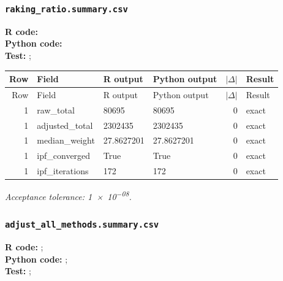 \documentclass[10pt]{article}
\begin{document}
\subsubsection{\texorpdfstring{\texttt{raking\_ratio.summary.csv}}{raking\_ratio.summary.csv}}
{\footnotesize \textbf{R code:} \\ \textbf{Python code:} \\ \textbf{Test:} ; \par}

\small
\begin{longtable}{@{}r p{}p{}p{}rl@{}}
\toprule
Row & Field & R output & Python output & $|\Delta|$ & Result \\
\midrule
\endfirsthead
\toprule
Row & Field & R output & Python output & $|\Delta|$ & Result \\
\midrule
\endhead
1 & raw\_\allowbreak{}total & 80695 & 80695 & 0 & exact \\
1 & adjusted\_\allowbreak{}total & 2302435 & 2302435 & 0 & exact \\
1 & median\_\allowbreak{}weight & 27.8627201 & 27.8627201 & 0 & exact \\
1 & ipf\_\allowbreak{}converged & True & True & 0 & exact \\
1 & ipf\_\allowbreak{}iterations & 172 & 172 & 0 & exact \\
\bottomrule
\end{longtable}
\normalsize
\textit{Acceptance tolerance: \num{1e-08}.}

\subsubsection{\texorpdfstring{\texttt{adjust\_all\_methods.summary.csv}}{adjust\_all\_methods.summary.csv}}
{\footnotesize \textbf{R code:} ; \\ \textbf{Python code:} ; \\ \textbf{Test:} ; \par}
\end{document}
